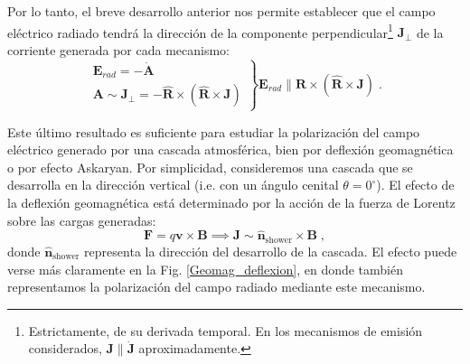 \documentclass[11 pt, a4paper]{article} %
\numberwithin{equation}{section}
\numberwithin{figure}{section}
\numberwithin{table}{section}
\newcommand{\vect}[1]{\boldsymbol{\mathbf{#1}}}
\begin{document}
Por lo tanto, el breve desarrollo anterior nos permite establecer que el campo eléctrico radiado tendrá la dirección de la componente perpendicular\footnote{Estrictamente, de su derivada temporal. En los mecanismos de emisión considerados, $\vect{J}\parallel \dot{\vect{J}}$ aproximadamente.} $\vect{J}_\perp$ de la corriente generada por cada mecanismo:
\begin{equation}
	\left.
	\begin{array}{c}
		\vect{E}_{rad} = -\dot{\vect{A}}\\
		\vect{A}\sim\vect{J}_\perp=-\hat{\vect{R}}\times\left(\hat{\vect{R}}\times\vect{J}\right)
	\end{array}
\right\}\vect{E}_{rad}\parallel  \hat{\vect{R}}\times\left(\hat{\vect{R}}\times\vect{J}\right)\;.\label{ec37}
\end{equation}

Este último resultado es suficiente para estudiar la polarización del campo eléctrico generado por una cascada atmosférica, bien por deflexión geomagnética o por efecto Askaryan. Por simplicidad, consideremos una cascada que se desarrolla en la dirección vertical (i.e. con un ángulo cenital $\theta=0^\circ$). El efecto de la deflexión geomagnética está determinado por la acción de la fuerza de Lorentz sobre las cargas generadas:
\begin{equation}
	\vect{F}=q\vect{v}\times \vect{B}\implies \vect{J}\sim \hat{\vect{n}}_{\text{shower}}\times\vect{B}\;,\label{ec38}
\end{equation}
donde $\hat{\vect{n}}_{\text{shower}}$ representa la dirección del desarrollo de la cascada. El efecto puede verse más claramente en la Fig. \ref{Geomag_deflexion}, en donde también representamos la polarización del campo radiado mediante este mecanismo.
\end{document}
